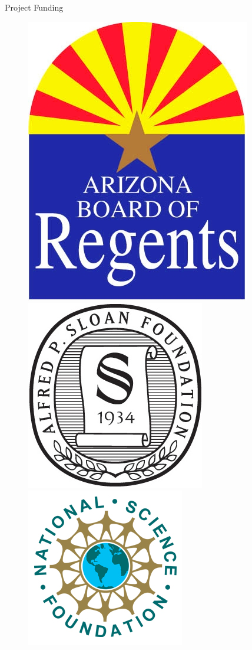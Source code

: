 \documentclass[final]{beamer}
\newlength{\colwidth}
\begin{document}
\begin{frame}[t]
\begin{columns}[t]
\begin{column}{\colwidth}
  \begin{block}{Project Funding}
      \begin{figure}[!htb]
          \begin{center}
            \includegraphics[width=.35\linewidth]{assets/SponsorLogos/ABOR}
          \end{center}
        \endminipage
        \hskip 2cm
          \begin{center}
            \includegraphics[width=.42\linewidth]{assets/SponsorLogos/APSloanFdn}
          \end{center}
        \endminipage\hfill
          \begin{center}
            \includegraphics[width=.50\linewidth]{assets/SponsorLogos/NSF}
          \end{center}
        \endminipage\hfill
      \end{figure}
  \end{block}
\end{column}


\end{columns}
\end{frame}
\end{document}
